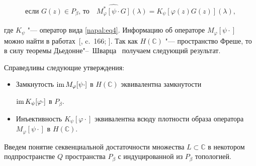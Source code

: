  \begin{eqnarray*}

\text{если $G(z)\in P_\beta$, то} \quad  

  \widehat{M^*_\varphi [\psi \cdot G]}(\lambda) = K_\psi [\varphi(z)G(z)](\lambda),

  \end{eqnarray*}

  где $K_\psi$ "--- оператор вида \eqref{napal:eq4}. Информацию об операторе $M_\varphi [\psi \cdot]$ можно найти в работах~[, c.~166; ]. Так как $H(\mathbb{C})$ "--- пространство Фреше, то в силу теоремы Дьедонне"--~Шварца~\cite{napal:bib23} получаем следующий результат.



\smallskip



  \begin{theorem}[2]Справедливы следующие утверждения\/{\rm:}



\begin{itemize}



\item[{\rm 1.}] Замкнутость $\mathop{\rm im} M_\varphi [\psi \cdot]$ в $H(\mathbb{C})$ эквивалентна замкнутости

    $\mathop{\rm im} K_\psi [\varphi \cdot]$ в $P_\beta.$



\item[{\rm 2.}] Инъективность $K_\psi [\varphi \cdot]$ эквивалентна всюду плотности образа оператора $M_\varphi [\psi \cdot]$ в $H(\mathbb{C}).$



\end{itemize}



  \end{theorem}



\smallskip



     Введем понятие секвенциальной достаточности множества $L \subset \mathbb{C}$ в некотором подпространстве $Q$ пространства $P_\beta$ с индуцированной из $P_\beta$ топологией.



\smallskip



